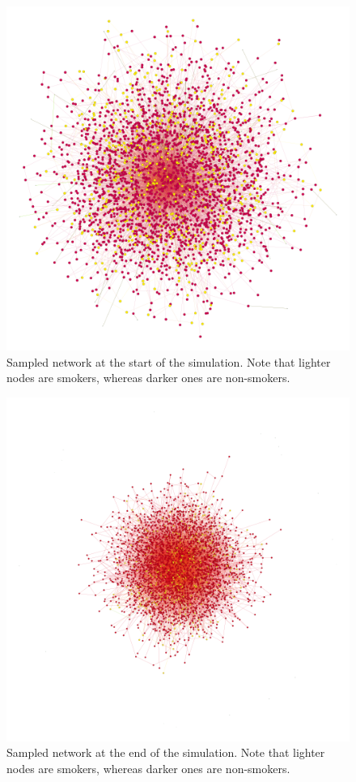 \documentclass[]{report}
\begin{document}
\begin{figure}
\begin{center}
\includegraphics[scale=0.4]{sample-init.png}
\end{center}
\caption{Sampled network at the start of the simulation. Note that lighter nodes are smokers, whereas darker ones are non-smokers.}
\label{img:sample-init}
\end{figure}

\begin{figure}
\begin{center}
\includegraphics[scale=0.4]{sample-fin.png}
\end{center}
\caption{Sampled network at the end of the simulation. Note that lighter nodes are smokers, whereas darker ones are non-smokers.}
\label{img:sample-fin}
\end{figure}
\end{document}

